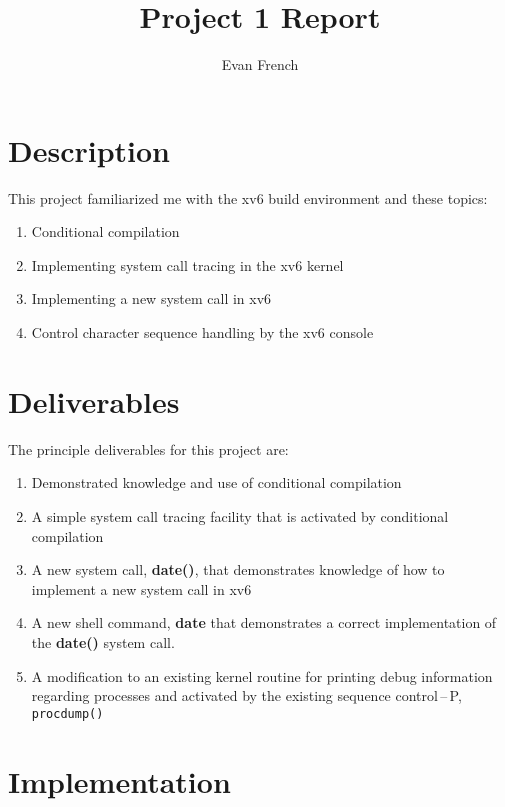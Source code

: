 \documentclass[12pt,letterpaper]{report}
\author{Evan French}
\title{Project 1 Report}
\begin{document}
	\maketitle
	
	\section*{Description}
	
	This project familiarized me with the xv6 build environment and these topics:
	\begin{enumerate}
	\item Conditional compilation
	\item Implementing system call tracing in the xv6 kernel
	\item Implementing a new system call in xv6
	\item Control character sequence handling by the xv6 console
	\end{enumerate}
	
	
	\section*{Deliverables}
	
	The principle deliverables for this project are:
	\begin{enumerate}
	\item Demonstrated knowledge and use of conditional compilation
	\item A simple system call tracing facility that is activated by conditional compilation
	\item A new system call, \textbf{date()}, that demonstrates knowledge of how to implement a new system call in xv6
	\item A new shell command, \textbf{date} that demonstrates a correct implementation of the \textbf{date()} system call.
	\item A modification to an existing kernel routine for printing debug information regarding processes and activated by the existing sequence control\,--\,P, \texttt{procdump()}
	\end{enumerate}
	
	
	
	\section*{Implementation}
\end{document}
